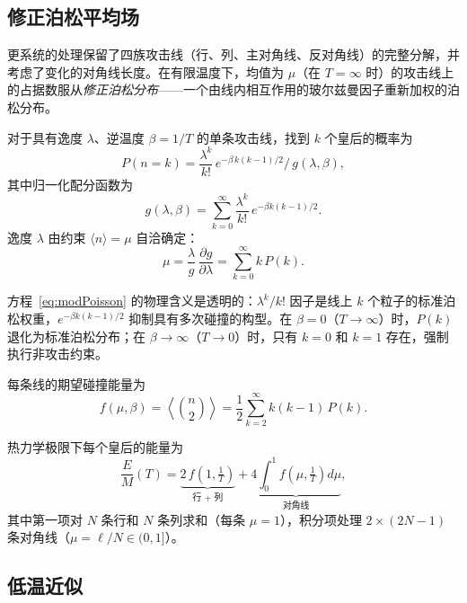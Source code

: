 \documentclass[aps, pre, reprint, amsmath, amssymb, superscriptaddress, floatfix]{revtex4-2}
\begin{document}
\subsection{修正泊松平均场}

更系统的处理保留了四族攻击线（行、列、主对角线、反对角线）的完整分解，并考虑了变化的对角线长度。在有限温度下，均值为 $\mu$（在 $T = \infty$ 时）的攻击线上的占据数服从\textit{修正泊松分布}——一个由线内相互作用的玻尔兹曼因子重新加权的泊松分布。

对于具有逸度 $\lambda$、逆温度 $\beta = 1/T$ 的单条攻击线，找到 $k$ 个皇后的概率为
\begin{equation}
  P(n = k) = \frac{\lambda^k}{k!}\,
  e^{-\beta\,k(k-1)/2}\Big/\,g(\lambda, \beta),
  \label{eq:modPoisson}
\end{equation}
其中归一化配分函数为
\begin{equation}
  g(\lambda, \beta) = \sum_{k=0}^\infty
  \frac{\lambda^k}{k!}\,e^{-\beta k(k-1)/2}.
  \label{eq:g_def}
\end{equation}
逸度 $\lambda$ 由约束 $\langle n \rangle = \mu$ 自洽确定：
\begin{equation}
  \mu = \frac{\lambda}{g}\,\frac{\partial g}{\partial \lambda}
  = \sum_{k=0}^\infty k\,P(k).
  \label{eq:mu_constraint}
\end{equation}

方程~\eqref{eq:modPoisson} 的物理含义是透明的：$\lambda^k/k!$ 因子是线上 $k$ 个粒子的标准泊松权重，$e^{-\beta k(k-1)/2}$ 抑制具有多次碰撞的构型。在 $\beta = 0$（$T \to \infty$）时，$P(k)$ 退化为标准泊松分布；在 $\beta \to \infty$（$T \to 0$）时，只有 $k = 0$ 和 $k = 1$ 存在，强制执行非攻击约束。

每条线的期望碰撞能量为
\begin{equation}
  f(\mu, \beta) = \left\langle\binom{n}{2}\right\rangle
  = \frac{1}{2}\sum_{k=2}^{\infty} k(k-1)\,P(k).
  \label{eq:f_def}
\end{equation}

热力学极限下每个皇后的能量为
\begin{equation}
  \frac{E}{M}(T) = \underbrace{2\,f\!\left(1,\tfrac{1}{T}\right)
  }_{\text{行 + 列}}
  + \underbrace{4\int_0^1 f\!\left(\mu,\tfrac{1}{T}\right)d\mu
  }_{\text{对角线}},
  \label{eq:E_MF}
\end{equation}
其中第一项对 $N$ 条行和 $N$ 条列求和（每条 $\mu = 1$），积分项处理 $2 \times (2N-1)$ 条对角线（$\mu = \ell/N \in (0,1]$）。

\subsection{低温近似}
\end{document}
